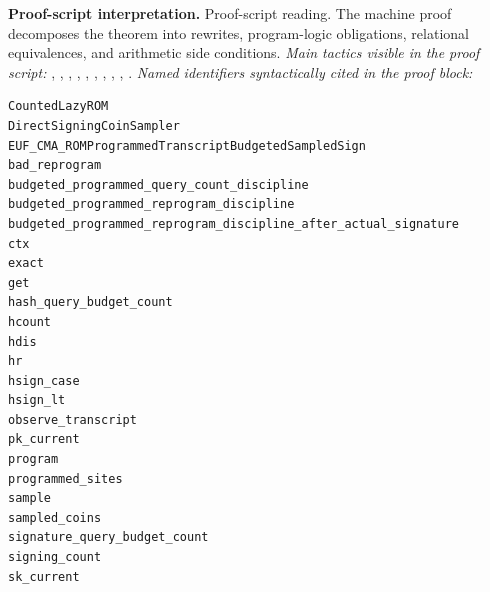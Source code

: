 \begin{formaltheorem}
\noindent\textbf{Proof-script interpretation.}
Proof-script reading. The machine proof decomposes the theorem into rewrites, program-logic obligations, relational equivalences, and arithmetic side conditions.
\emph{Main tactics visible in the proof script:} , , , , , , , , , .
\emph{Named identifiers syntactically cited in the proof block:}
\begin{lstlisting}[language=EasyCrypt,basicstyle=\ttfamily\scriptsize]
CountedLazyROM
DirectSigningCoinSampler
EUF_CMA_ROMProgrammedTranscriptBudgetedSampledSign
bad_reprogram
budgeted_programmed_query_count_discipline
budgeted_programmed_reprogram_discipline
budgeted_programmed_reprogram_discipline_after_actual_signature
ctx
exact
get
hash_query_budget_count
hcount
hdis
hr
hsign_case
hsign_lt
observe_transcript
pk_current
program
programmed_sites
sample
sampled_coins
signature_query_budget_count
signing_count
sk_current
\end{lstlisting}

\end{formaltheorem}

